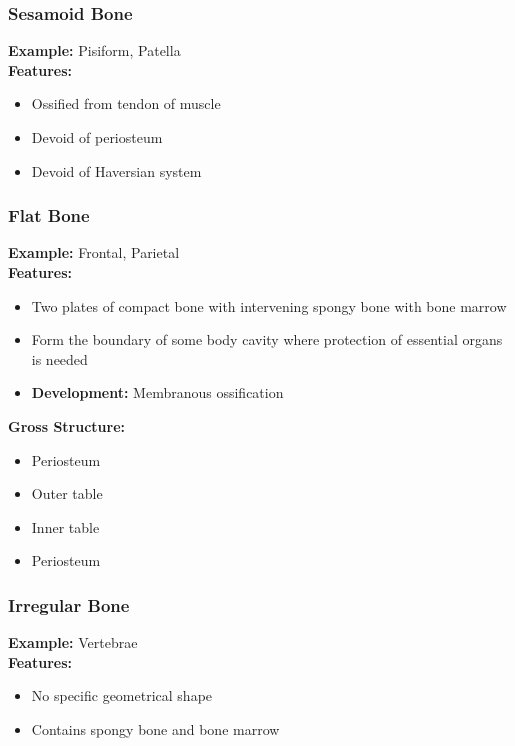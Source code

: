 \documentclass[11pt]{article}
\begin{document}
\subsubsection*{Sesamoid Bone}
\textbf{Example:} Pisiform, Patella\\
\textbf{Features:}
\begin{itemize}
    \item Ossified from tendon of muscle
    \item Devoid of periosteum
    \item Devoid of Haversian system
\end{itemize}

\subsubsection*{Flat Bone}
\textbf{Example:} Frontal, Parietal\\
\textbf{Features:}
\begin{itemize}
    \item Two plates of compact bone with intervening spongy bone with bone marrow
    \item Form the boundary of some body cavity where protection of essential organs is needed
    \item \textbf{Development:} Membranous ossification
\end{itemize}
\textbf{Gross Structure:}
\begin{itemize}
    \item Periosteum
    \item Outer table
    \item Inner table
    \item Periosteum
\end{itemize}

\subsubsection*{Irregular Bone}
\textbf{Example:} Vertebrae\\
\textbf{Features:}
\begin{itemize}
    \item No specific geometrical shape
    \item Contains spongy bone and bone marrow
\end{itemize}
\end{document}
